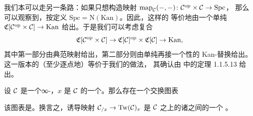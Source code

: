 \begin{remark}\label{rem:alternative-mapping-functor}
我们本可以走另一条路：如果只想构造映射\trFunctor{}%
$\mathrm{map}_{\mathcal{C}}(-, -)\colon \mathcal{C}^{\mathrm{op}} \times \mathcal{C} \to \mathrm{Spc}$，
那么可以观察到，按定义 $\mathrm{Spc} = \mathrm{N}(\mathrm{Kan})$。因此，这样的%
\trFunctor{}等价地由一个单纯\trFunctor{}%
$\mathfrak{C}[\mathcal{C}^{\mathrm{op}} \times \mathcal{C}] \to \mathrm{Kan}$
给出。于是我们可以考虑复合
\[
\mathfrak{C}[\mathcal{C}^{\mathrm{op}} \times \mathcal{C}]
  \to \mathfrak{C}[\mathcal{C}]^{\mathrm{op}} \times \mathfrak{C}[\mathcal{C}]
  \to \mathrm{Kan},
\]
其中第一部分由典范映射给出，第二部分则由单纯\trMappingSpace{}再接一个\trFunctor{}性的
Kan-替换给出。这一版本的\trBivariant{}\trMappingSpace{}\trFunctor{}（至少逐点地）等价于我们的做法，
其确认由 \cite{Lur09} 中的定理 1.1.5.13 给出。
\end{remark}

\begin{lemma}\label{lem:slice-twisted-fibre}
设 $\mathcal{C}$ 是一个∞-\trCategory{}，$x$ 是 $\mathcal{C}$ 的一个\trObject{}。那么存在一个交换图表
\begin{center}
\end{center}
该图表是\trHomotopyCartesian{}。换言之，诱导映射
$\mathcal{C}_{/x} \to \mathrm{Tw}(\mathcal{C})_x$ 是 $\mathcal{C}$ 之上的诸\trRightFibration{}之间的一个%
\trJoyalEquivalence{}。
\end{lemma}

